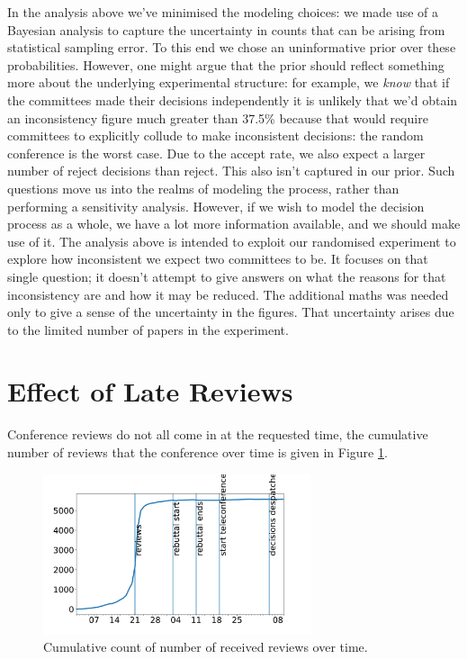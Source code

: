 In the analysis above we've minimised the modeling choices: we made use
of a Bayesian analysis to capture the uncertainty in counts that can be
arising from statistical sampling error. To this end we chose an
uninformative prior over these probabilities. However, one might argue
that the prior should reflect something more about the underlying
experimental structure: for example, we \emph{know} that if the
committees made their decisions independently it is unlikely that we'd
obtain an inconsistency figure much greater than 37.5\% because that
would require committees to explicitly collude to make inconsistent
decisions: the random conference is the worst case. Due to the accept
rate, we also expect a larger number of reject decisions than reject.
This also isn't captured in our prior. Such questions move us into the
realms of modeling the process, rather than performing a sensitivity
analysis. However, if we wish to model the decision process as a whole,
we have a lot more information available, and we should make use of it.
The analysis above is intended to exploit our randomised experiment to
explore how inconsistent we expect two committees to be. It focuses on
that single question; it doesn't attempt to give answers on what the
reasons for that inconsistency are and how it may be reduced. The
additional maths was needed only to give a sense of the uncertainty in
the figures. That uncertainty arises due to the limited number of papers
in the experiment.

\section{Effect of Late Reviews}
\label{app:effect-of-late-reviews}

Conference reviews do not all come in at the requested time, the cumulative number of reviews that the conference over time is given in Figure \ref{review-count}.

\begin{figure}[htb]
\centering
\includegraphics[width=0.70\textwidth]{diagrams/neurips/review-count.pdf}
\caption{Cumulative count of number of received reviews over time.}
\label{review-count}
\end{figure}

